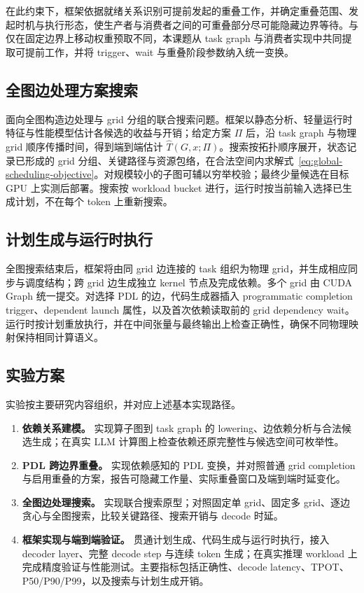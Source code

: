 在此约束下，框架依据就绪关系识别可提前发起的重叠工作，并确定重叠范围、发起时机与执行形态，使生产者与消费者之间的可重叠部分尽可能隐藏边界等待。与仅在固定边界上移动权重预取不同，本课题从 task graph 与消费者实现中共同提取可提前工作，并将 trigger、wait 与重叠阶段参数纳入统一变换。

\subsection{全图边处理方案搜索}

面向全图构造边处理与 grid 分组的联合搜索问题。框架以静态分析、轻量运行时特征与性能模型估计各候选的收益与开销；给定方案 $\Pi$ 后，沿 task graph 与物理 grid 顺序传播时间，得到端到端估计 $\widehat{T}(G,x;\Pi)$。搜索按拓扑顺序展开，状态记录已形成的 grid 分组、关键路径与资源包络，在合法空间内求解式~\eqref{eq:global-scheduling-objective}。对规模较小的子图可辅以穷举校验；最终少量候选在目标 GPU 上实测后部署。搜索按 workload bucket 进行，运行时按当前输入选择已生成计划，不在每个 token 上重新搜索。

\subsection{计划生成与运行时执行}

全图搜索结束后，框架将由同 grid 边连接的 task 组织为物理 grid，并生成相应同步与调度结构；跨 grid 边生成独立 kernel 节点及完成依赖。多个 grid 由 CUDA Graph 统一提交。对选择 PDL 的边，代码生成器插入 programmatic completion trigger、dependent launch 属性，以及首次依赖读取前的 grid dependency wait。运行时按计划重放执行，并在中间张量与最终输出上检查正确性，确保不同物理映射保持相同计算语义。

\subsection{实验方案}

实验按主要研究内容组织，并对应上述基本实现路径。

\begin{enumerate}
  \item \textbf{依赖关系建模。}
  实现算子图到 task graph 的 lowering、边依赖分析与合法候选生成；在真实 LLM 计算图上检查依赖还原完整性与候选空间可枚举性。

  \item \textbf{PDL 跨边界重叠。}
  实现依赖感知的 PDL 变换，并对照普通 grid completion 与启用重叠的方案，报告可隐藏工作量、实际重叠窗口及端到端时延变化。

  \item \textbf{全图边处理搜索。}
  实现联合搜索原型；对照固定单 grid、固定多 grid、逐边贪心与全图搜索，比较关键路径、搜索开销与 decode 时延。

  \item \textbf{框架实现与端到端验证。}
  贯通计划生成、代码生成与运行时执行，接入 decoder layer、完整 decode step 与连续 token 生成；在真实推理 workload 上完成精度验证与性能测试。主要指标包括正确性、decode latency、TPOT、P50/P90/P99，以及搜索与计划生成开销。
\end{enumerate}
